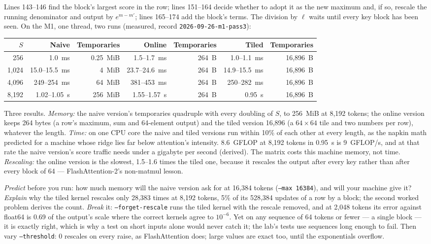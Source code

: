 \noindent Lines 143--146 find the block's largest score in the row; lines
151--164 decide whether to adopt it as the new maximum and, if so, rescale the
running denominator and output by $e^{m-m'}$; lines 165--174 add the block's
terms. The division by $\ell$ waits until every key block has been seen. On the
M1, one thread, two runs (measured, record \texttt{2026-09-26-m1-pass3}):

\begin{center}\small
\begin{tabular}{@{}rrrrrrr@{}}
\toprule
$S$ & Naive & Temporaries & Online & Temporaries & Tiled & Temporaries \\
\midrule
256 & 1.0~ms & 0.25~MiB & 1.5--1.7~ms & 264~B & 1.0--1.1~ms & 16,896~B \\
1,024 & 15.0--15.5~ms & 4~MiB & 23.7--24.6~ms & 264~B & 14.9--15.5~ms & 16,896~B \\
4,096 & 249--254~ms & 64~MiB & 381--453~ms & 264~B & 250--282~ms & 16,896~B \\
8,192 & 1.02--1.05~s & 256~MiB & 1.55--1.57~s & 264~B & 0.95~s & 16,896~B \\
\bottomrule
\end{tabular}
\end{center}

\noindent Three results. \emph{Memory:} the naive version's temporaries
quadruple with every doubling of $S$, to 256~MiB at 8,192 tokens; the online
version keeps 264 bytes (a row's maximum, sum and 64-element output) and the
tiled version 16,896 (a $64 \times 64$ tile and two numbers per row), whatever
the length. \emph{Time:} on one CPU core the naive and tiled versions run
within 10\% of each other at every length, as the napkin math predicted for a
machine whose ridge lies far below attention's intensity. 8.6~GFLOP at 8,192
tokens in 0.95~s is 9~GFLOP/s, and at that rate the naive version's score
traffic needs under a gigabyte per second (derived). The matrix costs this
machine memory, not time. \emph{Rescaling:} the online version is the slowest,
1.5--1.6 times the tiled one, because it rescales the output after every key
rather than after every block of 64 --- FlashAttention-2's non-matmul lesson.

\emph{Predict} before you run: how much memory will the naive version ask for
at 16,384 tokens (\texttt{--max 16384}), and will your machine give it?
\emph{Explain} why the tiled kernel rescales only 28,383 times at 8,192 tokens,
5\% of its 528,384 updates of a row by a block; the second worked problem
derives the count. \emph{Break} it: \texttt{--forget-rescale} runs the tiled
kernel with the rescale removed, and at 2,048 tokens its error against float64
is 0.69 of the output's scale where the correct kernels agree to $10^{-6}$. Yet
on any sequence of 64 tokens or fewer --- a single block --- it is exactly right,
which is why a test on short inputs alone would never catch it; the lab's tests
use sequences long enough to fail. Then vary \texttt{--threshold}: 0 rescales on
every raise, as FlashAttention does; large values are exact too, until the
exponentials overflow.

